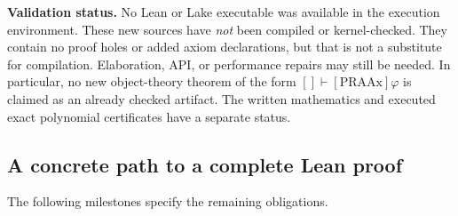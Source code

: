 \textbf{Validation status.} No Lean or Lake executable was available
in the execution environment. These new sources have \emph{not} been
compiled or kernel-checked. They contain no proof holes or added axiom
declarations, but that is not a substitute for compilation. Elaboration,
API, or performance repairs may still be needed. In particular, no new
object-theory theorem of the form $[]\vdash[\mathrm{PRAAx}]\varphi$ is
claimed as an already checked artifact. The written mathematics and
executed exact polynomial certificates have a separate status.

\subsection{A concrete path to a complete Lean proof}
The following milestones specify the remaining obligations.
